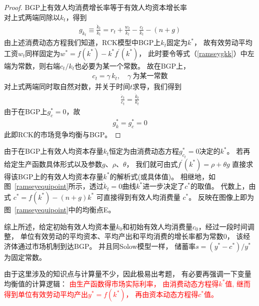 \documentclass[cn,normal,11pt,black]{elegantnote}
\begin{document}
    \begin{proof}{BGP上有效人均消费增长率等于有效人均资本增长率}
    \mbox{} \\
    对上式两端同除以$k_t$，得到
    \begin{align}
        g_{k_t} \equiv \frac{\dot{k}_t}{k_t} = r_t + \frac{w_t}{k_t} - \frac{c_t}{k_t} - (n+g)     \label{ramseygkk}
    \end{align}
    由上述消费动态方程我们知道，RCK模型中BGP上$k_t$固定为$k^*$，
    故有效劳动平均工资$w_t$同样固定为$w^* = f(k^*) - k^* f^\prime(k^*)$，
    此时要令等式（\ref{ramseygkk}）中左端为常数，则右端$c_t/k_t$也必要为某一个常数。
    故在BGP上，
    \begin{align}
        c_t = \gamma \, k_t, \quad \gamma \ \mbox{为某一常数}
    \end{align}
    对上式两端同时取自然对数，并关于时间$t$求导，我们得到
    \begin{align}
        \frac{\dot{c}_t}{c_t} = \frac{\dot{k}_t}{k_t}
    \end{align}
    由于在BGP上$g_{c}^*=0$，故
    \begin{align}
        g^*_k = g^*_c =0
    \end{align}
    此即RCK的市场竞争均衡与BGP。
    \end{proof}

    由于在BGP上有效人均资本存量$k_t$恒定为由消费动态方程$g_{c_t}^*=0$决定的$k^*$。
    若再给定生产函数具体形式以及参数$g$、$\rho$、$\theta$，
    我们就可由式$f^\prime(k^*) = \rho + \theta g$
    直接求得该BGP上的有效人均资本存量$k^*$的解析式(或具体值)。
    相继地，如图~\ref{ramseyequipoint}所示，透过$\dot{k}_t = 0$曲线$k^*$进一步决定了$c^*$的取值。
    代数上，由式 $c^*=f(k^*)-(n+g)k^*$ 可直接得到有效人均消费量 $c^*$。
    反映在图像上即为图~\ref{ramseyequipoint}中的均衡点E。

    综上所述，给定初始有效人均资本量$k_0$和初始有效人均消费量$c_0$，经过一段时间调整，
    单位有效劳动的平均资本、平均产出和平均消费的增长率都为常数0，
    该经济体通过市场机制到达BGP。
    并且同Solow模型一样，
    储蓄率$ s= (y^* - c^*)/ y^*$为固定常数。

\begin{note}[计算逻辑]
    由于这里涉及的知识点与计算量不少，因此极易出考题，
    有必要再强调一下变量均衡值的计算逻辑：
    \textcolor{red}{
    由生产函数得市场实际利率，
    由消费动态方程得$k^*$值,
    继而得到单位有效劳动平均产出$y^* = f(k^*)$，
    再由资本动态方程得$c^*$值。}
\end{note}
\end{document}
